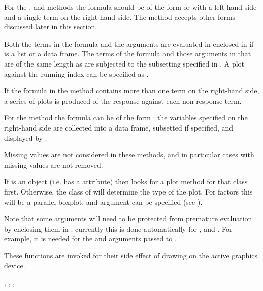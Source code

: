 \begin{Details}\relax
For the ,  and  methods the formula
should be of the form  or  with a left-hand
side and a single term on the right-hand side.  The  method
accepts other forms discussed later in this section.

Both the terms in the formula and the  arguments are
evaluated in  enclosed in  if
 is a list or a data frame.  The terms of the formula and
those arguments in  that are of the same length as
 are subjected to the subsetting specified in
.  A plot against the running index can be specified as
.

If the formula in the  method contains more than one term
on the right-hand side, a series of plots is produced of the response
against each non-response term.

For the  method the formula can be of the form
: the variables specified on the right-hand side are
collected into a data frame, subsetted if specified, and displayed by
.

Missing values are not considered in these methods, and in particular
cases with missing values are not removed.

If  is an object (i.e. has a  attribute)
then  looks for a plot method for that class first.
Otherwise, the class of  will determine the type of the plot.
For factors this will be a parallel boxplot, and argument
 can be specified (see ).

Note that some arguments will need to be protected from premature
evaluation by enclosing them in : currently this is
done automatically for ,  and .  For
example, it is needed for the  and 
arguments passed to .
\end{Details}
%
\begin{Value}
These functions are invoked for their side effect of drawing
on the active graphics device.
\end{Value}
%
\begin{SeeAlso}\relax
{}, , ,
.
\end{SeeAlso}
